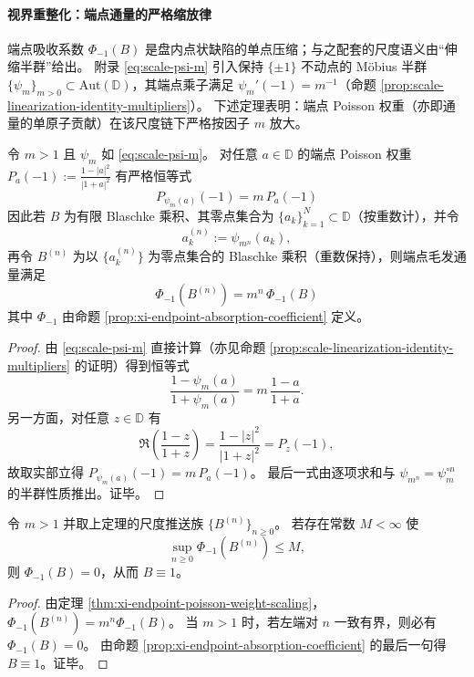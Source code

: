 \paragraph{视界重整化：端点通量的严格缩放律}
端点吸收系数 \(\Phi_{-1}(B)\) 是盘内点状缺陷的单点压缩；与之配套的尺度语义由“伸缩半群”给出。
附录 \eqref{eq:scale-psi-m} 引入保持 \(\{\pm 1\}\) 不动点的 Möbius 半群 \(\{\psi_m\}_{m>0}\subset\mathrm{Aut}(\mathbb{D})\)，其端点乘子满足 \(\psi_m'(-1)=m^{-1}\)（命题 \ref{prop:scale-linearization-identity-multipliers}）。
下述定理表明：端点 Poisson 权重（亦即通量的单原子贡献）在该尺度链下严格按因子 \(m\) 放大。

\begin{theorem}\label{thm:xi-endpoint-poisson-weight-scaling}
令 \(m>1\) 且 \(\psi_m\) 如 \eqref{eq:scale-psi-m}。
对任意 \(a\in\mathbb{D}\) 的端点 Poisson 权重
\(
P_a(-1):=\frac{1-|a|^2}{|1+a|^2}
\)
有严格恒等式
\[
\boxed{\;P_{\psi_m(a)}(-1)=m\,P_a(-1)\;}
\]
因此若 \(B\) 为有限 Blaschke 乘积、其零点集合为 \(\{a_k\}_{k=1}^{N}\subset\mathbb{D}\)（按重数计），并令
\[
a_k^{(n)}:=\psi_{m^n}(a_k),
\]
再令 \(B^{(n)}\) 为以 \(\{a_k^{(n)}\}\) 为零点集合的 Blaschke 乘积（重数保持），则端点毛发通量满足
\[
\boxed{\;\Phi_{-1}(B^{(n)})=m^n\,\Phi_{-1}(B)\;}
\]
其中 \(\Phi_{-1}\) 由命题 \ref{prop:xi-endpoint-absorption-coefficient} 定义。
\end{theorem}

\begin{proof}
由 \eqref{eq:scale-psi-m} 直接计算（亦见命题 \ref{prop:scale-linearization-identity-multipliers} 的证明）得到恒等式
\[
\frac{1-\psi_m(a)}{1+\psi_m(a)}=m\,\frac{1-a}{1+a}.
\]
另一方面，对任意 \(z\in\mathbb{D}\) 有
\[
\Re\!\left(\frac{1-z}{1+z}\right)=\frac{1-|z|^2}{|1+z|^2}=P_z(-1),
\]
故取实部立得 \(P_{\psi_m(a)}(-1)=m\,P_a(-1)\)。
最后一式由逐项求和与 \(\psi_{m^n}=\psi_m^{\circ n}\) 的半群性质推出。证毕。
\end{proof}

\begin{corollary}[跨尺度闭合 \texorpdfstring{$\Longrightarrow$}{=>} 无毛发固定点]\label{cor:xi-nohair-fixedpoint-flux-closure}
令 \(m>1\) 并取上定理的尺度推送族 \(\{B^{(n)}\}_{n\ge 0}\)。
若存在常数 \(M<\infty\) 使
\[
\sup_{n\ge 0}\Phi_{-1}(B^{(n)})\le M,
\]
则 \(\Phi_{-1}(B)=0\)，从而 \(B\equiv 1\)。
\end{corollary}

\begin{proof}
由定理 \ref{thm:xi-endpoint-poisson-weight-scaling}，\(\Phi_{-1}(B^{(n)})=m^n\Phi_{-1}(B)\)。
当 \(m>1\) 时，若左端对 \(n\) 一致有界，则必有 \(\Phi_{-1}(B)=0\)。
由命题 \ref{prop:xi-endpoint-absorption-coefficient} 的最后一句得 \(B\equiv 1\)。证毕。
\end{proof}

